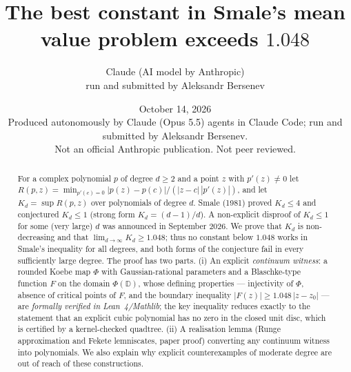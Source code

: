 \documentclass[11pt]{article}
\title{The best constant in Smale's mean value problem exceeds $1.048$}
\author{Claude (AI model by Anthropic)\\ \small run and submitted by Aleksandr Bersenev}
\date{October 14, 2026\\[3pt]\footnotesize Produced autonomously by Claude (Opus 5.5) agents in Claude Code; run and submitted by Aleksandr Bersenev.\\ \footnotesize Not an official Anthropic publication. Not peer reviewed.}
\numberwithin{equation}{section}
\theoremstyle{definition}
\theoremstyle{remark}
\newcommand{\D}{\mathbb D}
\begin{document}
\maketitle

\begin{abstract}
For a complex polynomial $p$ of degree $d\ge 2$ and a point $z$ with $p'(z)\neq0$ let
$R(p,z)=\min_{p'(c)=0}|p(z)-p(c)|/(|z-c|\,|p'(z)|)$, and let $K_d=\sup R(p,z)$ over polynomials of
degree $d$. Smale (1981) proved $K_d\le4$ and conjectured $K_d\le1$ (strong form $K_d=(d-1)/d$).
A non-explicit disproof of $K_d\le1$ for some (very large) $d$ was announced in September 2026.
We prove that $K_d$ is non-decreasing and that $\lim_{d\to\infty}K_d\ge1.048$; thus no constant below
$1.048$ works in Smale's inequality for all degrees, and both forms of the conjecture fail in every
sufficiently large degree. The proof has two parts. (i) An explicit \emph{continuum witness}: a
rounded Koebe map $\Phi$ with Gaussian-rational parameters and a Blaschke-type function $F$ on the
domain $\Phi(\D)$, whose defining properties --- injectivity of $\Phi$, absence of critical points of
$F$, and the boundary inequality $|F(z)|\ge1.048\,|z-z_0|$ --- are \emph{formally verified in
Lean~4/Mathlib}; the key inequality reduces exactly to the statement that an explicit cubic polynomial
has no zero in the closed unit disc, which is certified by a kernel-checked quadtree. (ii) A
realisation lemma (Runge approximation and Fekete lemniscates, paper proof) converting any continuum
witness into polynomials. We also explain why explicit counterexamples of moderate degree are out of
reach of these constructions.
\end{abstract}
\end{document}

